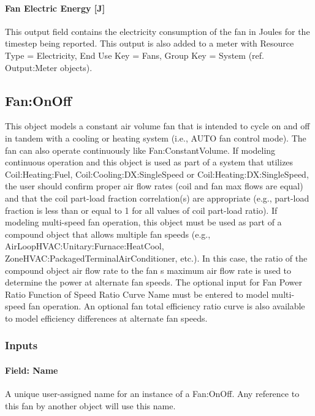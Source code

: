 \paragraph{Fan Electric Energy {[}J{]}}\label{fan-electric-energy-j}

This output field contains the electricity consumption of the fan in Joules for the timestep being reported. This output is also added to a meter with Resource Type = Electricity, End Use Key = Fans, Group Key = System (ref. Output:Meter objects).

\subsection{Fan:OnOff}\label{fanonoff}

This object models a constant air volume fan that is intended to cycle on and off in tandem with a cooling or heating system (i.e., AUTO fan control mode). The fan can also operate continuously like Fan:ConstantVolume. If modeling continuous operation and this object is used as part of a system that utilizes Coil:Heating:Fuel, Coil:Cooling:DX:SingleSpeed or Coil:Heating:DX:SingleSpeed, the user should confirm proper air flow rates (coil and fan max flows are equal) and that the coil part-load fraction correlation(s) are appropriate (e.g., part-load fraction is less than or equal to 1 for all values of coil part-load ratio). If modeling multi-speed fan operation, this object must be used as part of a compound object that allows multiple fan speeds (e.g., AirLoopHVAC:Unitary:Furnace:HeatCool, ZoneHVAC:PackagedTerminalAirConditioner, etc.). In this case, the ratio of the compound object air flow rate to the fan s maximum air flow rate is used to determine the power at alternate fan speeds. The optional input for Fan Power Ratio Function of Speed Ratio Curve Name must be entered to model multi-speed fan operation. An optional fan total efficiency ratio curve is also available to model efficiency differences at alternate fan speeds.

\subsubsection{Inputs}\label{inputs-1-017}

\paragraph{Field: Name}\label{field-name-1-016}

A unique user-assigned name for an instance of a Fan:OnOff. Any reference to this fan by another object will use this name.

